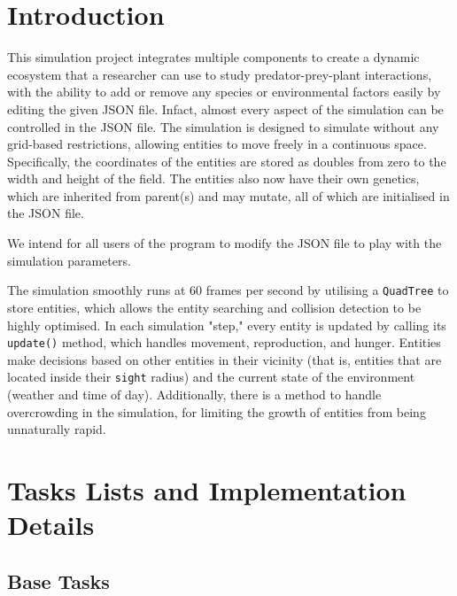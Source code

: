 \documentclass[10pt, a4paper]{scrartcl}
\begin{document}
    \begin{multicols}{2}


        \section{Introduction}
        \noindent This simulation project integrates multiple components to create a dynamic ecosystem that a researcher can use to
        study predator-prey-plant interactions, with the ability to add or remove any species or environmental factors easily
        by editing the given JSON file. Infact, almost every aspect of the simulation can be controlled in the JSON file.
        The simulation is designed to simulate without any grid-based restrictions, allowing entities to move freely in a
        continuous space. Specifically, the coordinates of the entities are stored as doubles from zero to the width and height
        of the field. The entities also now have their own genetics, which are inherited from parent(s) and may mutate,
        all of which are initialised in the JSON file.

        We intend for all users of the program to modify the JSON file to play with the simulation parameters.

        \noindent The simulation smoothly runs at 60 frames per second by utilising a \verb|QuadTree| to store entities, which allows
        the entity searching and collision detection to be highly optimised. In each simulation "step," every entity is updated
        by calling its \verb|update()| method, which handles movement, reproduction, and hunger.
        Entities make decisions based on other entities in their vicinity (that is, entities that are located inside their
        \verb|sight| radius) and the current state of the environment (weather and time of day). Additionally, there is a
        method to handle overcrowding in the simulation, for limiting the growth of entities from being unnaturally rapid.

        \section{Tasks Lists and Implementation Details}

        \subsection{Base Tasks}


\end{multicols}
\end{document}
